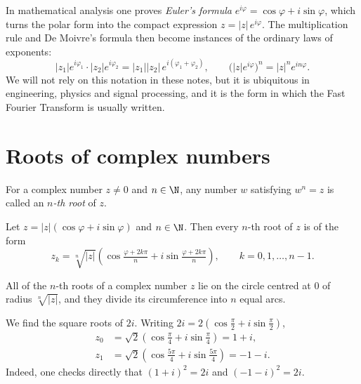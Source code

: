 \begin{remark}
In mathematical analysis one proves \emph{Euler's formula} $e^{i\varphi} = \cos\varphi + i\sin\varphi$, which
turns the polar form into the compact expression $z = |z|\,e^{i\varphi}$. The multiplication rule and
De Moivre's formula then become instances of the ordinary laws of exponents:
\[
|z_1|e^{i\varphi_1}\cdot |z_2|e^{i\varphi_2} = |z_1||z_2|\,e^{i(\varphi_1+\varphi_2)}, \qquad
\big(|z|e^{i\varphi}\big)^n = |z|^n e^{in\varphi}.
\]
We will not rely on this notation in these notes, but it is ubiquitous in engineering, physics and signal
processing, and it is the form in which the Fast Fourier Transform is usually written.
\end{remark}

\section{Roots of complex numbers}

\begin{definition}
For a complex number $z\neq 0$ and $n\in\N$, any number $w$ satisfying $w^n=z$ is called an \emph{$n$-th root}
of $z$.
\end{definition}

\begin{theorem}
Let $z=|z|(\cos \varphi + i\sin\varphi)$ and $n\in \N$. Then every $n$-th root of $z$ is of the form
\[
z_k = \sqrt[n]{|z|}\left(\cos \tfrac{\varphi+2k\pi}{n} + i\sin \tfrac{\varphi+2k\pi}{n}\right),
\qquad k=0,1,\ldots, n-1.
\]
\end{theorem}

\begin{fact}
All of the $n$-th roots of a complex number $z$ lie on the circle centred at $0$ of radius $\sqrt[n]{|z|}$,
and they divide its circumference into $n$ equal arcs.
\end{fact}

\begin{example}
We find the square roots of $2i$. Writing $2i = 2\left(\cos\tfrac\pi2 + i \sin \tfrac\pi2\right)$,
\[
\begin{aligned}
z_0 &= \sqrt{2}\left(\cos\tfrac{\pi}{4} + i \sin \tfrac{\pi}{4}\right)=1+i,\\
z_1 &= \sqrt{2}\left(\cos\tfrac{5\pi}{4} + i \sin \tfrac{5\pi}{4}\right)=-1-i.
\end{aligned}
\]
Indeed, one checks directly that $(1+i)^2 = 2i$ and $(-1-i)^2 = 2i$.
\end{example}

